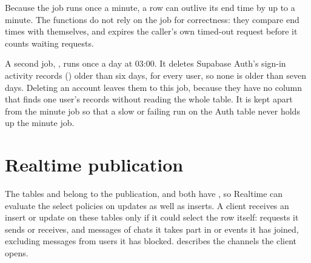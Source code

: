 Because the job runs once a minute, a row can outlive its end time by up to a minute. The functions do
not rely on the job for correctness: they compare end times with  themselves, and
 expires the caller's own timed-out request before it counts waiting requests.

A second  job, , runs  once a day
at 03:00. It deletes Supabase Auth's sign-in activity records () older than
six days, for every user, so none is older than seven days. Deleting an account leaves them to this job,
because they have no column that finds one user's records without reading the whole table. It is kept
apart from the minute job so that a slow or failing run on the Auth table never holds up the minute job.

\section{Realtime publication}
\label{sec:realtime-publication}

The tables  and  belong to the  publication,
and both have , so Realtime can evaluate the select policies on updates as
well as inserts. A client receives an insert or update on these tables only if it could select the row
itself: requests it sends or receives, and messages of chats it takes part in or events it has joined,
excluding messages from users it has blocked.  describes the channels the client opens.
